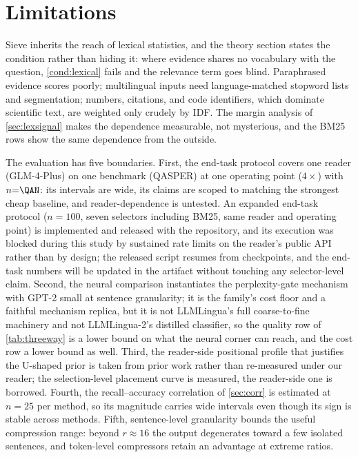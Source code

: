 \documentclass[preprint,12pt]{elsarticle}
\theoremstyle{remark}
\newcommand{\method}{Sieve}
\begin{document}
\section{Limitations}
\label{sec:limitations}
\method{} inherits the reach of lexical statistics, and the theory
section states the condition rather than hiding it: where evidence
shares no vocabulary with the question, \autoref{cond:lexical} fails
and the relevance term goes blind. Paraphrased evidence scores poorly;
multilingual inputs need language-matched stopword lists and
segmentation; numbers, citations, and code identifiers, which
dominate scientific text, are weighted only crudely by IDF. The
margin analysis of \autoref{sec:lexsignal} makes the dependence
measurable, not mysterious, and the BM25 rows show the same
dependence from the outside.

The evaluation has five boundaries. First, the end-task protocol
covers one reader (GLM-4-Plus) on one benchmark (QASPER) at one
operating point ($4\times$) with $n{=}\QAN$: its intervals are wide, its
claims are scoped to matching the strongest cheap baseline, and
reader-dependence is untested. An expanded end-task protocol
($n=100$, seven selectors including BM25, same reader and operating
point) is implemented and released with the repository, and its
execution was blocked during this study by sustained rate limits on
the reader's public API rather than by design; the released script
resumes from checkpoints, and the end-task numbers will be updated in
the artifact without touching any selector-level claim. Second, the
neural comparison instantiates the perplexity-gate mechanism with
GPT-2 small at sentence granularity; it is the family's cost floor
and a faithful mechanism replica, but it is not LLMLingua's full
coarse-to-fine machinery and not LLMLingua-2's distilled classifier,
so the quality row of \autoref{tab:threeway} is a lower bound on what
the neural corner can reach, and the cost row a lower bound as well.
Third, the reader-side positional profile that justifies the U-shaped
prior is taken from prior work \citep{liu2023lost} rather than
re-measured under our reader; the selection-level placement curve is
measured, the reader-side one is borrowed. Fourth, the
recall--accuracy correlation of \autoref{sec:corr} is estimated at
$n=25$ per method, so its magnitude carries wide intervals even
though its sign is stable across methods. Fifth, sentence-level
granularity bounds the useful compression range: beyond
$r \approx 16$ the output degenerates toward a few isolated
sentences, and token-level compressors retain an advantage at extreme
ratios.
\end{document}
